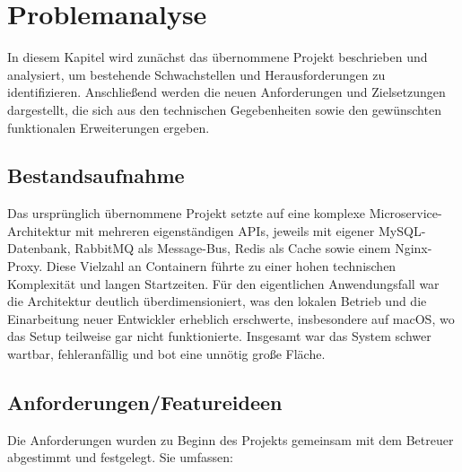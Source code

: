 \documentclass[oneside]{ausarbeitung}
\begin{document}
\chapter{Problemanalyse}
\label{cha:problemanalyse}

In diesem Kapitel wird zunächst das übernommene Projekt beschrieben und analysiert, um bestehende Schwachstellen und Herausforderungen zu identifizieren. Anschließend werden die neuen Anforderungen und Zielsetzungen dargestellt, die sich aus den technischen Gegebenheiten sowie den gewünschten funktionalen Erweiterungen ergeben.

\section{Bestandsaufnahme}
Das ursprünglich übernommene Projekt setzte auf eine komplexe Microservice-Architektur mit mehreren eigenständigen APIs, jeweils mit eigener MySQL-Datenbank, RabbitMQ als Message-Bus, Redis als Cache sowie einem Nginx-Proxy. Diese Vielzahl an Containern führte zu einer hohen technischen Komplexität und langen Startzeiten. Für den eigentlichen Anwendungsfall war die Architektur deutlich überdimensioniert, was den lokalen Betrieb und die Einarbeitung neuer Entwickler erheblich erschwerte, insbesondere auf macOS, wo das Setup teilweise gar nicht funktionierte. Insgesamt war das System schwer wartbar, fehleranfällig und bot eine unnötig große Fläche.

\section{Anforderungen/Featureideen}

Die Anforderungen wurden zu Beginn des Projekts gemeinsam mit dem Betreuer abgestimmt und festgelegt. Sie umfassen:
\end{document}
